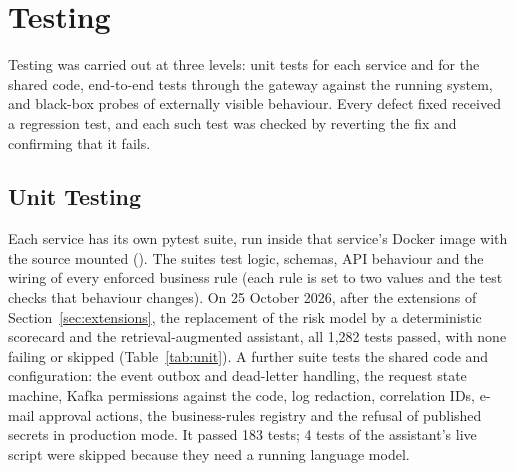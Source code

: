 \section{Testing}
Testing was carried out at three levels: unit tests for each service and for the shared code, end-to-end tests through the gateway against the running system, and black-box probes of externally visible behaviour. Every defect fixed received a regression test, and each such test was checked by reverting the fix and confirming that it fails.

\subsection{Unit Testing}
Each service has its own pytest suite, run inside that service's Docker image with the source mounted (). The suites test logic, schemas, API behaviour and the wiring of every enforced business rule (each rule is set to two values and the test checks that behaviour changes). On 25 October 2026, after the extensions of Section~\ref{sec:extensions}, the replacement of the risk model by a deterministic scorecard and the retrieval-augmented assistant, all 1,282 tests passed, with none failing or skipped (Table~\ref{tab:unit}). A further suite tests the shared code and configuration: the event outbox and dead-letter handling, the request state machine, Kafka permissions against the code, log redaction, correlation IDs, e-mail approval actions, the business-rules registry and the refusal of published secrets in production mode. It passed 183 tests; 4 tests of the assistant's live script were skipped because they need a running language model.

